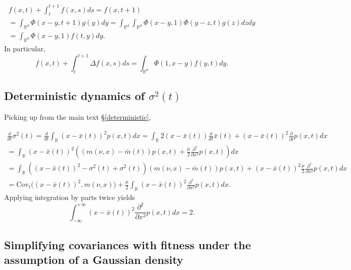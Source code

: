 \documentclass[]{article}
\begin{document}
\begin{multline}
f(x,t)+\int_t^{t+1}\dot f(x,s)ds=f(x,t+1) \\
=\int_{\mathbb{R}^d}\Phi(x-y,t+1)g(y)dy=\int_{\mathbb{R}^d}\int_{\mathbb{R}^d}\Phi(x-y,1)\Phi(y-z,t)g(z)dzdy \\
=\int_{\mathbb{R}^d}\Phi(x-y,1)f(t,y)dy.
\end{multline} In particular, \begin{equation}
f(x,t)+\int_t^{t+1}\Delta f(x,s)ds=\int_{\mathbb{R}^d}\Phi(1,x-y)f(y,t)dy.
\end{equation}

\hypertarget{deterministic-dynamics-of-sigma2t}{%
\subsection{\texorpdfstring{Deterministic dynamics of \(\sigma^2(t)\)
\label{var_deriv}}{Deterministic dynamics of \textbackslash{}sigma\^{}2(t) }}\label{deterministic-dynamics-of-sigma2t}}

Picking up from the main text \S\ref{deterministic},

\begin{multline}
\frac{d}{dt}\sigma^2(t)=\frac{d}{dt}\int_\mathbb{R}(x-\bar x(t))^2p(x,t)dx=\int_\mathbb{R}2(x-\bar x(t))\frac{d}{dt}{\bar x}(t)+(x-\bar x(t))^2\frac{\partial}{\partial t} p(x,t)dx\\=\int_\mathbb{R}(x-\bar x(t))^2\left((m(\nu,x)-\bar m(t))p(x,t)+\frac{\mu}{2}\frac{\partial^2}{\partial x^2}p(x,t)\right)dx\\=\int_\mathbb{R}\left((x-\bar x(t))^2-\sigma^2(t)+\sigma^2(t)\right)(m(\nu,x)-\bar m(t))p(x,t)+(x-\bar x(t))^2\frac{\mu}{2}\frac{\partial^2}{\partial x^2}p(x,t)dx\\=\mathrm{Cov}_t\Big((x-\bar x(t))^2,m(\nu,x)\Big)+\frac{\mu}{2}\int_\mathbb{R}(x-\bar x(t))^2\frac{\partial^2}{\partial x^2}p(x,t)dx.
\end{multline} Applying integration by parts twice yields
\begin{equation}
\int_{-\infty}^{+\infty}(x-\bar x(t))^2\frac{\partial^2}{\partial x^2}p(x,t)dx=2.
\end{equation}

\hypertarget{simplifying-covariances-with-fitness-under-the-assumption-of-a-gaussian-density}{%
\subsection{\texorpdfstring{Simplifying covariances with fitness under
the assumption of a Gaussian density
\label{cov2deriv}}{Simplifying covariances with fitness under the assumption of a Gaussian density }}\label{simplifying-covariances-with-fitness-under-the-assumption-of-a-gaussian-density}}
\end{document}
